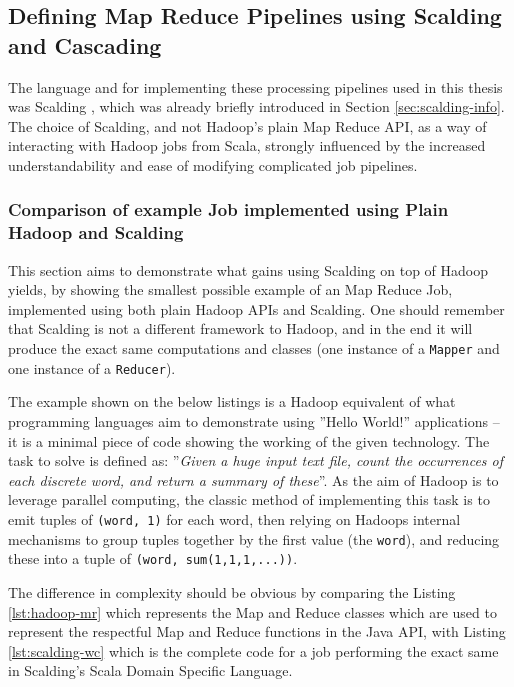\subsection{Defining Map Reduce Pipelines using Scalding and Cascading}
\label{sec:scalding-jobs}
The language and for implementing these processing pipelines used in this thesis was Scalding \cite{scalding}, which was already briefly introduced in Section \ref{sec:scalding-info}. The choice of Scalding, and not Hadoop's plain Map Reduce API, as a way of interacting with Hadoop jobs from Scala, strongly influenced by the increased understandability and ease of modifying complicated job pipelines. 

\subsubsection{Comparison of example Job implemented using Plain Hadoop and Scalding}

This section aims to demonstrate what gains using Scalding on top of Hadoop yields, by showing the smallest possible example of an Map Reduce Job, implemented using both plain Hadoop APIs and Scalding. One should remember that Scalding is not a different framework to  Hadoop, and in the end it will produce the exact same computations and classes (one instance of a \verb|Mapper| and one instance of a \verb|Reducer|).

The example shown on the below listings is a Hadoop equivalent of what programming languages aim to demonstrate using ''Hello World!'' applications -- it is a minimal piece of code showing the working of the given technology. The task to solve is defined as: ''\textit{Given a huge input text file, count the occurrences of each discrete word, and return a summary of these}''. As the aim of Hadoop is to leverage parallel computing, the classic method of implementing this task is to emit tuples of \verb|(word, 1)| for each word, then relying on Hadoops internal mechanisms to group tuples together by the first value (the \verb|word|), and reducing these into a tuple of \verb|(word, sum(1,1,1,...))|.

The difference in complexity should be obvious by comparing the Listing \ref{lst:hadoop-mr} which represents the Map and Reduce classes which are used to represent the respectful Map and Reduce functions in the Java API, with Listing \ref{lst:scalding-wc} which is the complete code for a job performing the exact same in Scalding's Scala Domain Specific Language. 

